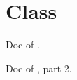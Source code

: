 \section{Class }\label{container-page-test-module-Toplevel+u+comments-class-c2}%
Doc of .

Doc of , part 2.



